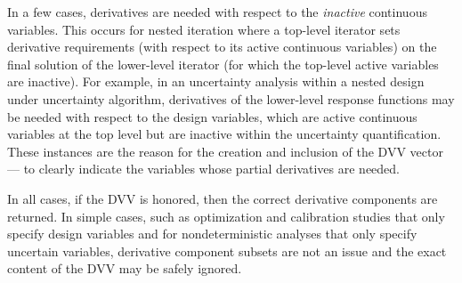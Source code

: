 
In a few cases, derivatives are needed with respect to the
\emph{inactive} continuous variables.  This occurs for nested
iteration where a top-level iterator sets derivative requirements
(with respect to its active continuous variables) on the final
solution of the lower-level iterator (for which the top-level active
variables are inactive).  For example, in an uncertainty analysis
within a nested design under uncertainty algorithm, derivatives of the
lower-level response functions may be needed with respect to the
design variables, which are active continuous variables at the top
level but are inactive within the uncertainty quantification.  These
instances are the reason for the creation and inclusion of the DVV
vector --- to clearly indicate the variables whose partial derivatives
are needed.

In all cases, if the DVV is honored, then the correct derivative
components are returned.  In simple cases, such as optimization and
calibration studies that only specify design variables and for
nondeterministic analyses that only specify uncertain variables,
derivative component subsets are not an issue and the exact content of
the DVV may be safely ignored.
